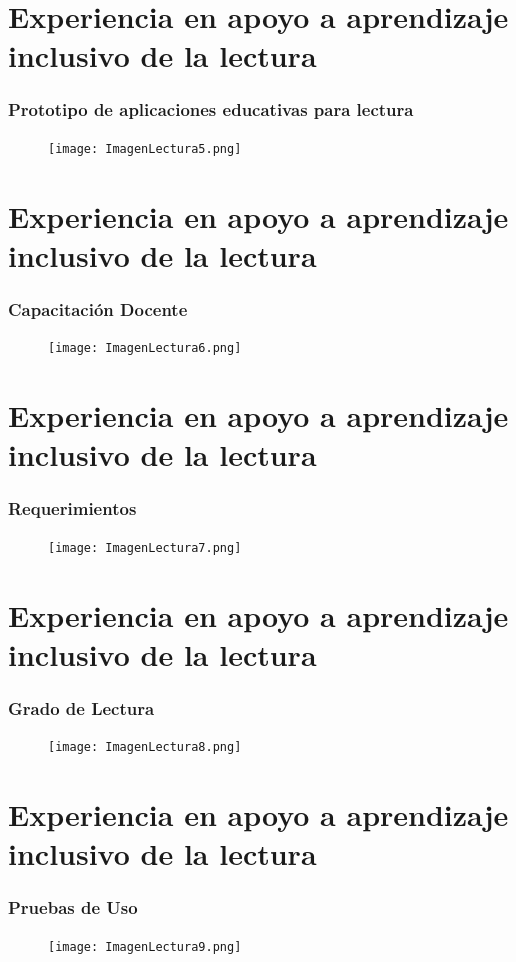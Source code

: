 \documentclass[11pt]{beamer}
\begin{document}
\section{Experiencia en apoyo a aprendizaje inclusivo de la lectura}
\begin{frame}
\frametitle{Prototipo de aplicaciones educativas para lectura}
    \begin{figure}
    \centering
     \texttt{[image: ImagenLectura5.png]}
    \end{figure}
\end{frame}

\section{Experiencia en apoyo a aprendizaje inclusivo de la lectura}
\begin{frame}
\frametitle{Capacitación Docente}
    \begin{figure}
    \centering
     \texttt{[image: ImagenLectura6.png]}
    \end{figure}
\end{frame}

\section{Experiencia en apoyo a aprendizaje inclusivo de la lectura}
\begin{frame}
\frametitle{Requerimientos}
    \begin{figure}
    \centering
     \texttt{[image: ImagenLectura7.png]}
    \end{figure}
\end{frame}

\section{Experiencia en apoyo a aprendizaje inclusivo de la lectura}
\begin{frame}
\frametitle{Grado de Lectura}
    \begin{figure}
    \centering
     \texttt{[image: ImagenLectura8.png]}
    \end{figure}
\end{frame}

\section{Experiencia en apoyo a aprendizaje inclusivo de la lectura}
\begin{frame}
\frametitle{Pruebas de Uso}
    \begin{figure}
    \centering
     \texttt{[image: ImagenLectura9.png]}
    \end{figure}
\end{frame}
\end{document}
